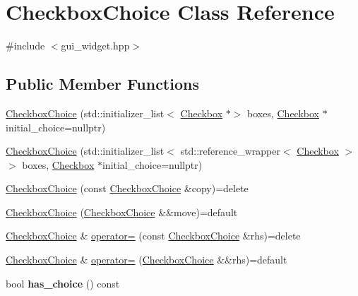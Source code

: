\hypertarget{class_checkbox_choice}{}\section{Checkbox\+Choice Class Reference}
\label{class_checkbox_choice}


{\ttfamily \#include $<$gui\+\_\+widget.\+hpp$>$}

\subsection*{Public Member Functions}
\begin{DoxyCompactItemize}
\item 
\mbox{\hyperlink{class_checkbox_choice_aef739358c920959f7158498af135d261}{Checkbox\+Choice}} (std\+::initializer\+\_\+list$<$ \mbox{\hyperlink{class_checkbox}{Checkbox}} $\ast$$>$ boxes, \mbox{\hyperlink{class_checkbox}{Checkbox}} $\ast$initial\+\_\+choice=nullptr)
\item 
\mbox{\hyperlink{class_checkbox_choice_acbbc8db19fa53fc73c913780e0fb2b89}{Checkbox\+Choice}} (std\+::initializer\+\_\+list$<$ std\+::reference\+\_\+wrapper$<$ \mbox{\hyperlink{class_checkbox}{Checkbox}} $>$$>$ boxes, \mbox{\hyperlink{class_checkbox}{Checkbox}} $\ast$initial\+\_\+choice=nullptr)
\item 
\mbox{\hyperlink{class_checkbox_choice_a1434699c2e3295b5037010403cbab6c9}{Checkbox\+Choice}} (const \mbox{\hyperlink{class_checkbox_choice}{Checkbox\+Choice}} \&copy)=delete
\item 
\mbox{\hyperlink{class_checkbox_choice_a907edd806c8e5a7ef45fdc64c013f4eb}{Checkbox\+Choice}} (\mbox{\hyperlink{class_checkbox_choice}{Checkbox\+Choice}} \&\&move)=default
\item 
\mbox{\hyperlink{class_checkbox_choice}{Checkbox\+Choice}} \& \mbox{\hyperlink{class_checkbox_choice_a8e99359a312be66fed6837c768e9e184}{operator=}} (const \mbox{\hyperlink{class_checkbox_choice}{Checkbox\+Choice}} \&rhs)=delete
\item 
\mbox{\hyperlink{class_checkbox_choice}{Checkbox\+Choice}} \& \mbox{\hyperlink{class_checkbox_choice_a8afcd170a63e030912620c18b0527fe8}{operator=}} (\mbox{\hyperlink{class_checkbox_choice}{Checkbox\+Choice}} \&\&rhs)=default
\item 
\mbox{\label{class_checkbox_choice_a6fd60881829607567eac28ba82c6a5b4}} 
bool {\bfseries has\+\_\+choice} () const
\item 

\end{DoxyCompactItemize}
